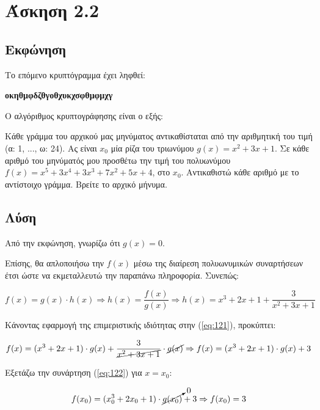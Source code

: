 \section{Άσκηση 2.2}

\subsection{Εκφώνηση} 

Το επόμενο κρυπτόγραμμα έχει ληφθεί:

\begin{center}
    \textbf{οκηθμφδζθγοθχυκχσφθμφμχγ}
\end{center}
Ο αλγόριθμος κρυπτογράφησης είναι ο εξής: 

Κάθε γράμμα του αρχικού μας μηνύματος αντικαθίσταται από την αριθμητική του τιμή (α: 1, ..., ω: 24). Ας είναι $x_0$ μία ρίζα του τριωνύμου $g(x) = x^2 + 3x + 1$. Σε κάθε αριθμό του μηνύματός μου προσθέτω την τιμή του πολυωνύμου $f(x) = x^5 + 3x^4 + 3x^3 + 7x^2 + 5x + 4$, στο $x_0$. Αντικαθιστώ κάθε αριθμό με το αντίστοιχο γράμμα. Βρείτε το αρχικό μήνυμα.

\subsection{Λύση} 

Από την εκφώνηση, γνωρίζω ότι $g(x) = 0$. 

Επίσης, θα απλοποιήσω την $f(x)$ μέσω της διαίρεση πολυωνυμικών συναρτήσεων έτσι ώστε να εκμεταλλευτώ την παραπάνω πληροφορία. Συνεπώς: 

\begin{equation} \label{eq:121}
    f(x) = g(x) \cdot h(x) \Rightarrow h(x) = \frac{f(x)}{g(x)} \Rightarrow h(x) = x^3+2x+1+\frac{3}{x^2+3x+1}
\end{equation}

Κάνοντας εφαρμογή της επιμεριστικής ιδιότητας στην (\ref{eq:121}), προκύπτει: 

\begin{equation} \label{eq:122}
    f(x) = (x^3+2x+1)\cdot g(x) + \frac{3}{\cancel{x^2+3x+1}}\cdot \cancel{g(x)} \Rightarrow f(x) = (x^3+2x+1) \cdot g(x) + 3
\end{equation}

Εξετάζω την συνάρτηση (\ref{eq:122}) για $x = x_0$:

\begin{equation} \label{eq:123}
    f(x_0) = (x_{0}^3+2x_0+1) \cdot \cancelto{0}{g(x_0)} + 3 \Rightarrow f(x_0) = 3
\end{equation}

